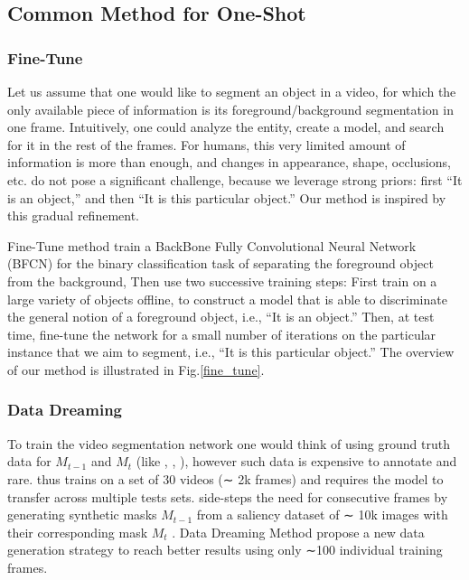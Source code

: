 \subsection{Common Method for One-Shot}

\subsubsection{Fine-Tune}
Let us assume that one would like to segment an object in a video, for which the only available piece of information is its foreground/background segmentation in one frame. Intuitively, one could analyze the entity, create a model, and search for it in the rest of the frames. For humans, this very limited amount of information is more than enough, and changes in appearance, shape, occlusions, etc. do not pose a significant challenge, because we leverage strong priors: first “It is an object,” and then “It is this particular object.” Our method is inspired by this gradual refinement.

Fine-Tune method \cite{OSVOS} \cite{OSVOS-S} \cite{OnAVOS} train a BackBone Fully Convolutional Neural Network (BFCN) for the binary classification task of separating the foreground object from the background, Then use two successive training steps: First train on a large variety of objects offline, to construct a model that is able to discriminate the general notion of a foreground object, i.e., “It is an object.” Then, at test time, fine-tune the network for a small number of iterations on the particular instance that we aim to segment, i.e., “It is this particular object.” The overview of our method is illustrated in Fig.\ref{fine_tune}.

\subsubsection{Data Dreaming}
To train the video segmentation network one would think of using ground truth data for $M_{t−1}$ and $M_t$ (like \cite{OSVOS}, \cite{bertinetto2016fully}, \cite{held2016learning}), however such data is expensive to annotate and rare. \cite{OSVOS} thus trains on a set of 30 videos (∼ 2k frames) and requires the model to transfer across multiple tests sets. \cite{Perazzi2017Learning} side-steps the need for consecutive frames by generating synthetic masks $M_{t-1}$ from a saliency dataset of ∼ 10k images with their corresponding mask $M_t$ . Data Dreaming Method\cite{LucidTracker} propose a new data generation strategy to reach better results using only ∼100 individual training frames.

